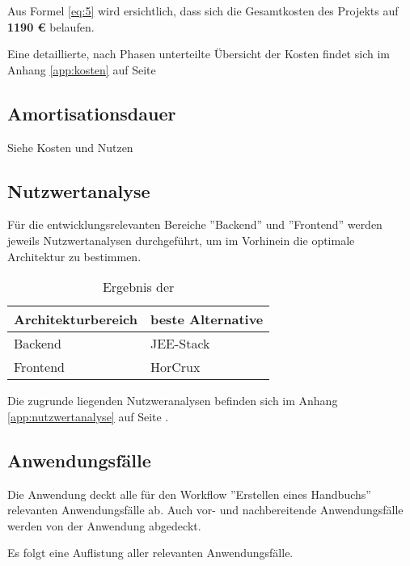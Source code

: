 \documentclass[12pt, xcolor=dvipsnames]{scrartcl}
\begin{document}
Aus Formel \ref{eq:5} wird ersichtlich, dass sich die Gesamtkosten des Projekts auf \textbf{1190 \euro{}} belaufen.

Eine detaillierte, nach Phasen unterteilte Übersicht der Kosten findet sich im Anhang \ref{app:kosten} auf Seite \pageref{app:kosten}

\subsection{Amortisationsdauer}

Siehe Kosten und Nutzen

\subsection{Nutzwertanalyse}
\label{sec:nutzwertanalyse}

Für die entwicklungsrelevanten Bereiche ''Backend'' und ''Frontend'' werden jeweils Nutzwertanalysen durchgeführt, um im Vorhinein die optimale Architektur zu bestimmen.

\begin{table}[H]
	\centering
	\begin{tabular}{ll}

		\rowcolor{white!15}				
		\textbf{Architekturbereich} & \textbf{beste Alternative} \\\hline		
				
		Backend & JEE-Stack \\
		Frontend & HorCrux	\\	
			    
	\end{tabular}
	\caption{Ergebnis der }
	\label{tab:nutzwertanalyse}
\end{table}

Die zugrunde liegenden Nutzweranalysen befinden sich im Anhang \ref{app:nutzwertanalyse} auf Seite \pageref{app:nutzwertanalyse}.

\subsection{Anwendungsfälle}

Die Anwendung deckt alle für den Workflow ''Erstellen eines Handbuchs'' relevanten Anwendungsfälle ab. Auch vor- und nachbereitende Anwendungsfälle werden von der Anwendung abgedeckt.

Es folgt eine Auflistung aller relevanten Anwendungsfälle.
\end{document}
